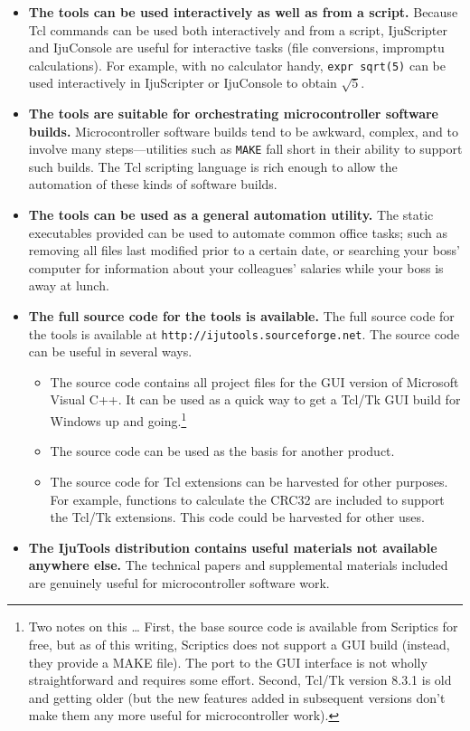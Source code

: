 \begin{itemize}
\item \textbf{The tools can be used interactively as well as from a script.} 
      Because Tcl commands can be used 
      both interactively and from
      a script, IjuScripter and IjuConsole are useful for interactive
      tasks (file conversions, impromptu calculations).  For example,
      with no calculator handy, \texttt{expr sqrt(5)} can be used
      interactively in IjuScripter or IjuConsole to obtain $\sqrt{5}$.
\item \textbf{The tools are suitable for orchestrating microcontroller
      software builds.}  Microcontroller software builds tend to be
      awkward, complex, and to involve many steps---utilities such as
      \texttt{MAKE} fall short in their ability to support
      such builds.  The Tcl scripting language
      is rich enough to allow the automation of these kinds of software builds.
\item \textbf{The tools can be used as a general automation utility.}
      The static executables provided can be used
      to automate common office tasks; such as 
      removing all files last modified prior to a certain date,
      or searching your boss' computer for information
      about your colleagues' salaries while your boss is away at lunch.
\item \textbf{The full source code for the tools is available.}  The full 
      source code for the tools is available at 
	  \texttt{http://ijutools.sourceforge.net}.  
	  The source code can be useful in several ways.
      \begin{itemize}
      \item The source code contains all project files for the GUI version
            of Microsoft Visual C++.  It can be used as a quick way to get
            a Tcl/Tk GUI build for Windows up and going.\footnote{Two notes on this
            \ldots{} First, the base source code is available from Scriptics
            for free, but as of this writing, Scriptics does not support
            a GUI build (instead, they provide a MAKE file).  The port to
            the GUI interface is not wholly straightforward and requires
            some effort.  Second, 
            Tcl/Tk version 8.3.1 is old and getting older (but the new 
            features added in subsequent versions don't make them any more
            useful for microcontroller work).}
      \item The source code can be used as the basis for another product.
      \item The source code for Tcl extensions can be harvested for other
            purposes.  For example, functions to calculate the CRC32
            are included to support the
            Tcl/Tk extensions.  This code could be harvested for other
            uses.
      \end{itemize}
\item \textbf{The IjuTools distribution contains useful materials not available
      anywhere else.}  The technical papers and supplemental materials included
      are genuinely useful for microcontroller software work.
\end{itemize}

